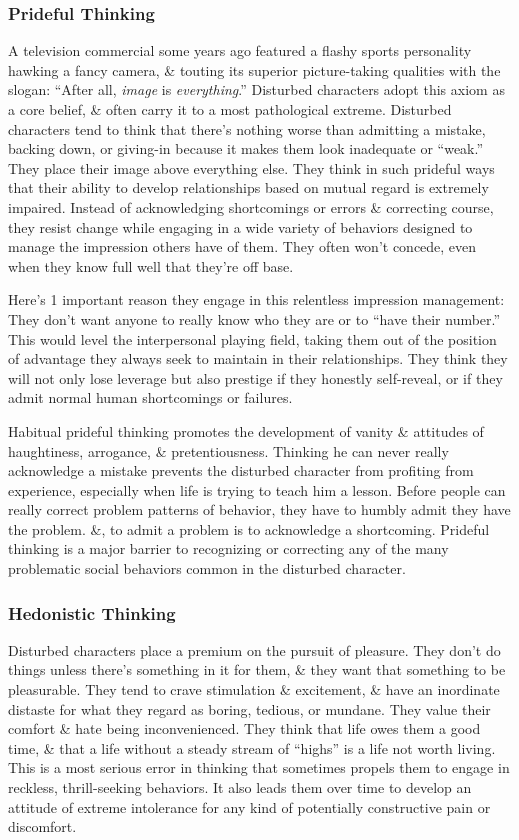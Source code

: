 \documentclass{article}
\numberwithin{equation}{section}
\begin{document}
\subsubsection{Prideful Thinking}
A television commercial some years ago featured a flashy sports personality hawking a fancy camera, \& touting its superior picture-taking qualities with the slogan: ``After all, \textit{image} is \textit{everything}.'' Disturbed characters adopt this axiom as a core belief, \& often carry it to a most pathological extreme. Disturbed characters tend to think that there's nothing worse than admitting a mistake, backing down, or giving-in because it makes them look inadequate or ``weak.'' They place their image above everything else. They think in such prideful ways that their ability to develop relationships based on mutual regard is extremely impaired. Instead of acknowledging shortcomings or errors \& correcting course, they resist change while engaging in a wide variety of behaviors designed to manage the impression others have of them. They often won't concede, even when they know full well that they're off base.

Here's 1 important reason they engage in this relentless impression management: They don't want anyone to really know who they are or to ``have their number.'' This would level the interpersonal playing field, taking them out of the position of advantage they always seek to maintain in their relationships. They think they will not only lose leverage but also prestige if they honestly self-reveal, or if they admit normal human shortcomings or failures.

Habitual prideful thinking promotes the development of vanity \& attitudes of haughtiness, arrogance, \& pretentiousness. Thinking he can never really acknowledge a mistake prevents the disturbed character from profiting from experience, especially when life is trying to teach him a lesson. Before people can really correct problem patterns of behavior, they have to humbly admit they have the problem. \&, to admit a problem is to acknowledge a shortcoming. Prideful thinking is a major barrier to recognizing or correcting any of the many problematic social behaviors common in the disturbed character.

\subsubsection{Hedonistic Thinking}
Disturbed characters place a premium on the pursuit of pleasure. They don't do things unless there's something in it for them, \& they want that something to be pleasurable. They tend to crave stimulation \& excitement, \& have an inordinate distaste for what they regard as boring, tedious, or mundane. They value their comfort \& hate being inconvenienced. They think that life owes them a good time, \& that a life without a steady stream of ``highs'' is a life not worth living. This is a most serious error in thinking that sometimes propels them to engage in reckless, thrill-seeking behaviors. It also leads them over time to develop an attitude of extreme intolerance for any kind of potentially constructive pain or discomfort.
\end{document}
